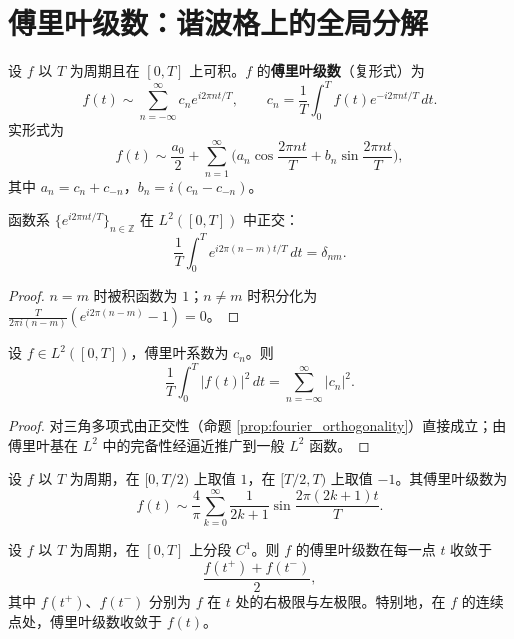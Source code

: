 \section{\texorpdfstring{傅里叶级数：谐波格上的全局分解}{傅里叶级数}}

\begin{definition}\label{def:fourier_series_foundations}
设 $f$ 以 $T$ 为周期且在 $[0,T]$ 上可积。$f$ 的\textbf{傅里叶级数}（复形式）为
\[
f(t) \sim \sum_{n=-\infty}^{\infty} c_n e^{i 2\pi n t / T}, \qquad
c_n = \frac{1}{T}\int_0^T f(t) e^{-i 2\pi n t / T}\,dt.
\]
实形式为
\[
f(t) \sim \frac{a_0}{2} + \sum_{n=1}^{\infty} \Big( a_n \cos\frac{2\pi n t}{T} + b_n \sin\frac{2\pi n t}{T} \Big),
\]
其中 $a_n = c_n + c_{-n}$，$b_n = i(c_n - c_{-n})$。
\end{definition}

\begin{proposition}[傅里叶基的正交性]\label{prop:fourier_orthogonality}
函数系 $\{e^{i 2\pi n t / T}\}_{n \in \mathbb{Z}}$ 在 $L^2([0,T])$ 中正交：
\[
\frac{1}{T}\int_0^T e^{i 2\pi (n-m) t / T}\,dt = \delta_{nm}.
\]
\end{proposition}

\begin{proof}
$n = m$ 时被积函数为 $1$；$n \neq m$ 时积分化为 $\frac{T}{2\pi i (n-m)}(e^{i 2\pi (n-m)} - 1) = 0$。
\end{proof}

\begin{theorem}\label{thm:parseval_fourier_classical}
设 $f \in L^2([0,T])$，傅里叶系数为 $c_n$。则
\[
\frac{1}{T}\int_0^T |f(t)|^2\,dt = \sum_{n=-\infty}^{\infty} |c_n|^2.
\]
\end{theorem}

\begin{proof}
对三角多项式由正交性（命题 \ref{prop:fourier_orthogonality}）直接成立；由傅里叶基在 $L^2$ 中的完备性经逼近推广到一般 $L^2$ 函数。
\end{proof}

\begin{example}[方波的傅里叶级数]\label{ex:fourier_square_wave}
设 $f$ 以 $T$ 为周期，在 $[0, T/2)$ 上取值 $1$，在 $[T/2, T)$ 上取值 $-1$。其傅里叶级数为
\[
f(t) \sim \frac{4}{\pi} \sum_{k=0}^{\infty} \frac{1}{2k+1} \sin\frac{2\pi (2k+1) t}{T}.
\]
\end{example}

\begin{theorem}[狄利克雷收敛定理]\label{thm:dirichlet_convergence}
设 $f$ 以 $T$ 为周期，在 $[0,T]$ 上分段 $C^1$。则 $f$ 的傅里叶级数在每一点 $t$ 收敛于
\[
\frac{f(t^+) + f(t^-)}{2},
\]
其中 $f(t^+)$、$f(t^-)$ 分别为 $f$ 在 $t$ 处的右极限与左极限。特别地，在 $f$ 的连续点处，傅里叶级数收敛于 $f(t)$。
\end{theorem}

